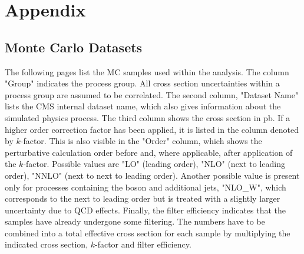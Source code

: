 

\renewcommand\thechapter{A}
\chapter{Appendix}

\section{Monte Carlo Datasets}
\label{app:mc_datasets}

The following pages list the \ac{MC} samples used within the analysis. 
The column "Group" indicates the process group. All cross section uncertainties within a process group are assumed to be correlated. 
The second column, "Dataset Name" lists the \ac{CMS} internal dataset name, which also gives information about the simulated physics process. 
The third column shows the cross section in \si{\pico\barn}. 
If a higher order correction factor has been applied, it is listed in the column denoted by $k$-factor. 
This is also visible in the "Order" column, which shows the perturbative calculation order before and, where applicable, after application of the $k$-factor. Possible values are "LO" (leading order), "NLO" (next to leading order), "NNLO" (next to next to leading order). Another possible value is present only for processes containing the \PW boson and additional jets, "NLO\_W", which corresponds to the next to leading order but is treated with a slightly larger uncertainty due to \ac{QCD} effects.
Finally, the filter efficiency indicates that the samples have already undergone some filtering. The numbers have to be combined into a total effective cross section for each sample by multiplying the indicated cross section, $k$-factor and filter efficiency.

